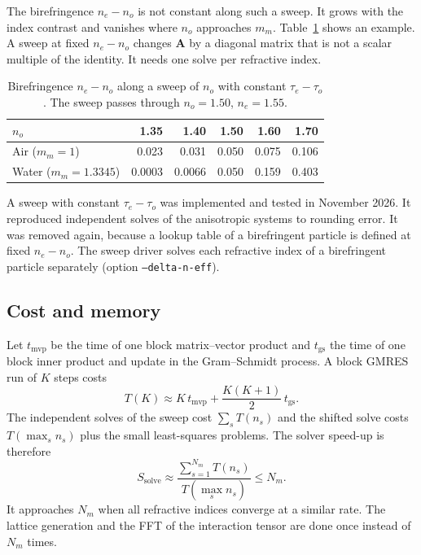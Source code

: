 \documentclass[11pt,a4paper]{article}
\begin{document}
The birefringence $n_e - n_o$ is not constant along such a sweep.
It grows with the index contrast and vanishes where $n_o$ approaches
$m_m$.
Table~\ref{tab:offset-birefringence} shows an example.
A sweep at fixed $n_e - n_o$ changes $\mathbf{A}$ by a diagonal matrix
that is not a scalar multiple of the identity.
It needs one solve per refractive index.

\begin{table}[htbp]
  \centering
  \caption{Birefringence $n_e - n_o$ along a sweep of $n_o$ with
           constant $\tau_e - \tau_o$.
           The sweep passes through $n_o = 1.50$, $n_e = 1.55$.}
  \label{tab:offset-birefringence}
  \begin{tabular}{lrrrrr}
    \toprule
    $n_o$ & 1.35 & 1.40 & 1.50 & 1.60 & 1.70 \\
    \midrule
    Air ($m_m = 1$)        & 0.023  & 0.031  & 0.050 & 0.075 & 0.106 \\
    Water ($m_m = 1.3345$) & 0.0003 & 0.0066 & 0.050 & 0.159 & 0.403 \\
    \bottomrule
  \end{tabular}
\end{table}

A sweep with constant $\tau_e - \tau_o$ was implemented and tested in
November 2026.
It reproduced independent solves of the anisotropic systems to
rounding error.
It was removed again, because a lookup table of a birefringent particle
is defined at fixed $n_e - n_o$.
The sweep driver solves each refractive index of a birefringent
particle separately (option \texttt{--delta-n-eff}).

\subsection{Cost and memory}
\label{sec:shift-cost}

Let $t_{\text{mvp}}$ be the time of one block matrix--vector product and
$t_{\text{gs}}$ the time of one block inner product and update in the
Gram--Schmidt process.
A block GMRES run of $K$ steps costs
\begin{equation}
  T(K) \approx K\, t_{\text{mvp}} + \frac{K(K+1)}{2}\, t_{\text{gs}} .
  \label{eq:gmres-cost}
\end{equation}
The independent solves of the sweep cost $\sum_s T(n_s)$ and the
shifted solve costs $T(\max_s n_s)$ plus the small least-squares
problems.
The solver speed-up is therefore
\begin{equation}
  S_{\text{solve}} \approx \frac{\sum_{s=1}^{N_m} T(n_s)}{T(\max_s n_s)}
    \le N_m .
  \label{eq:shift-speedup}
\end{equation}
It approaches $N_m$ when all refractive indices converge at a similar
rate.
The lattice generation and the FFT of the interaction tensor are done
once instead of $N_m$ times.
\end{document}

